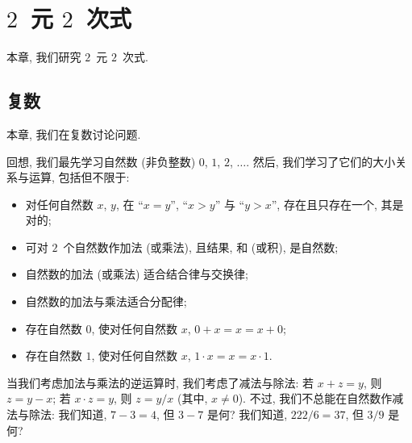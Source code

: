\documentclass[../libro.tex]{subfiles}
\begin{document}
\ifSubfilesClassLoaded{\appendix}{}

\chapter{\texorpdfstring{\(2\)~元 \(2\)~次式}%
{2 元 2 次式}}

本章, 我们研究
\(2\)~元 \(2\)~次式.

\clearpage

\section{复数}

本章, 我们在复数讨论问题.

回想, 我们最先学习自然数 (非负整数)
\(0\), \(1\), \(2\), \(\dots\).
然后, 我们学习了它们的大小关系与运算,
包括但不限于:
\begin{itemize}
    \item 对任何自然数 \(x\), \(y\),
        在 ``\(x = y\)'',
        ``\(x > y\)''
        与 ``\(y > x\)'',
        存在且只存在一个, 其是对的;
    \item 可对 \(2\)~个自然数作加法 (或乘法),
        且结果, 和 (或积), 是自然数;
    \item 自然数的加法 (或乘法) 适合结合律与交换律;
    \item 自然数的加法与乘法适合分配律;
    \item 存在自然数 \(0\), 使对任何自然数 \(x\),
        \(0 + x = x = x + 0\);
    \item 存在自然数 \(1\), 使对任何自然数 \(x\),
        \(1 \cdot x = x = x \cdot 1\).
\end{itemize}
当我们考虑加法与乘法的逆运算时,
我们考虑了减法与除法:
若 \(x + z = y\), 则 \(z = y - x\);
若 \(x \cdot z = y\), 则 \(z = y / x\)
(其中, \(x \neq 0\)).
不过, 我们不总能在自然数作减法与除法:
我们知道, \(7 - 3 = 4\), 但 \(3 - 7\) 是何?
我们知道, \(222 / 6 = 37\), 但 \(3 / 9\) 是何?
\end{document}
